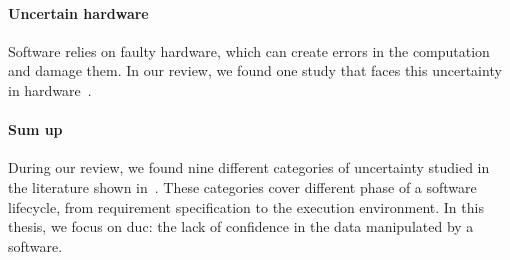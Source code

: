 \paragraph{Uncertain hardware}
Software relies on faulty hardware, which can create errors in the computation and damage them.
In our review, we found one study that faces this uncertainty in hardware~\cite{DBLP:conf/oopsla/CarbinMR13}.

\paragraph{Sum up}
During our review, we found nine different categories of uncertainty studied in the literature shown in~.
These categories cover different phase of a software lifecycle, from requirement specification to the execution environment.
In this thesis, we focus on \gls{duc}: the lack of confidence in the data manipulated by a software.

